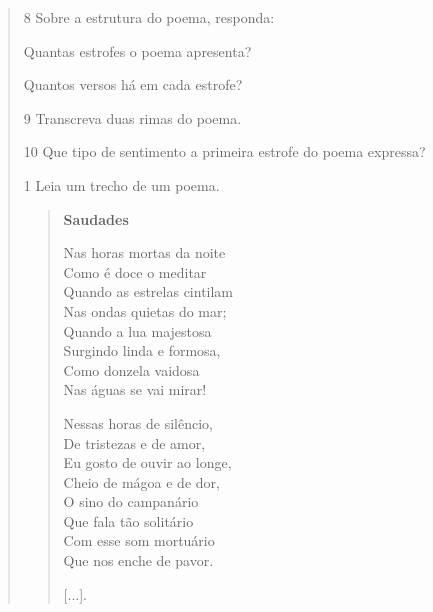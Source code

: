 \begin{quote}
\pagebreak
\num{8} Sobre a estrutura do poema, responda:

\begin{escolha}
\item Quantas estrofes o poema apresenta?


\item Quantos versos há em cada estrofe?

\end{escolha}


\num{9} Transcreva duas rimas do poema.



\num{10} Que tipo de sentimento a primeira estrofe do poema expressa?




\num{1} Leia um trecho de um poema.

\begin{verse}
\textbf{Saudades}

Nas horas mortas da noite\\
Como é doce o meditar\\
Quando as estrelas cintilam\\
Nas ondas quietas do mar;\\
Quando a lua majestosa\\
Surgindo linda e formosa,\\
Como donzela vaidosa\\
Nas águas se vai mirar!

Nessas horas de silêncio,\\
De tristezas e de amor,\\
Eu gosto de ouvir ao longe,\\
Cheio de mágoa e de dor,\\
O sino do campanário\\
Que fala tão solitário\\
Com esse som mortuário\\
Que nos enche de pavor.

{[}...{]}.

\end{verse}


\end{quote}
